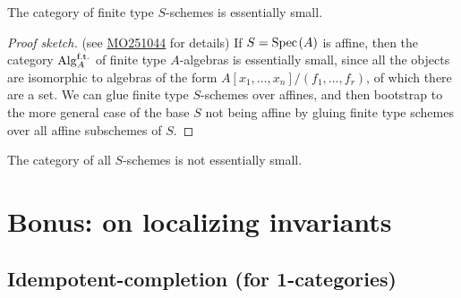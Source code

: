 \begin{theorem}\label{thm:finite-type-schemes-essentially-small} 
The category of finite type $S$-schemes is essentially small.
\end{theorem}
\begin{proof}[Proof sketch] (see \href{https://mathoverflow.net/a/251044}{MO251044} for details) If $S = \text{Spec}\hspace{0.1em}(A)$ is affine, then the category $\mathrm{Alg}_A^{\text{f.t.}}$ of finite type $A$-algebras is essentially small, since all the objects are isomorphic to algebras of the form $A[x_1, \ldots, x_n]/(f_1, \ldots, f_r)$, of which there are a set. We can glue finite type $S$-schemes over affines, and then bootstrap to the more general case of the base $S$ not being affine by gluing finite type schemes over all affine subschemes of $S$.
\end{proof}

\begin{remark} The category of all $S$-schemes is not essentially small.
\end{remark}

\section{Bonus: on localizing invariants}



\subsection{Idempotent-completion (for 1-categories)}

